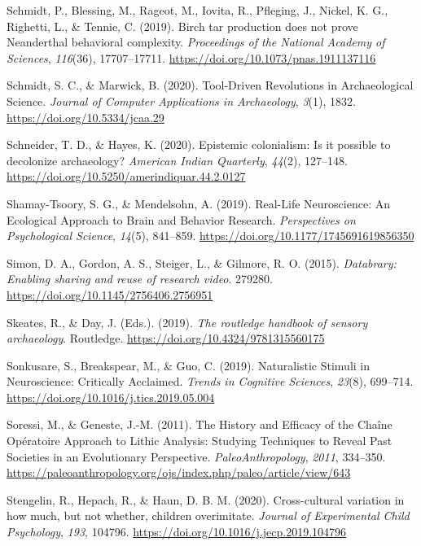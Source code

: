 \documentclass[
  11pt,
  letterpaper,
  DIV=11,
  numbers=noendperiod]{scrartcl}
\newlength{\cslhangindent}
\newenvironment{CSLReferences}[2] %
 {\begin{list}{}{%
  \setlength{\itemindent}{0pt}
  \setlength{\leftmargin}{0pt}
  \setlength{\parsep}{0pt}
  \ifodd #1
   \setlength{\leftmargin}{\cslhangindent}
   \setlength{\itemindent}{-1\cslhangindent}
  \fi
  \setlength{\itemsep}{#2\baselineskip}}}
 {\end{list}}
\begin{document}
\begin{CSLReferences}{1}{0}
Schmidt, P., Blessing, M., Rageot, M., Iovita, R., Pfleging, J., Nickel,
K. G., Righetti, L., \& Tennie, C. (2019). Birch tar production does not
prove Neanderthal behavioral complexity. \emph{Proceedings of the
National Academy of Sciences}, \emph{116}(36), 17707--17711.
\url{https://doi.org/10.1073/pnas.1911137116}

Schmidt, S. C., \& Marwick, B. (2020). Tool-Driven Revolutions in
Archaeological Science. \emph{Journal of Computer Applications in
Archaeology}, \emph{3}(1), 1832. \url{https://doi.org/10.5334/jcaa.29}

Schneider, T. D., \& Hayes, K. (2020). Epistemic colonialism: Is it
possible to decolonize archaeology? \emph{American Indian Quarterly},
\emph{44}(2), 127--148.
\url{https://doi.org/10.5250/amerindiquar.44.2.0127}

Shamay-Tsoory, S. G., \& Mendelsohn, A. (2019). Real-Life Neuroscience:
An Ecological Approach to Brain and Behavior Research.
\emph{Perspectives on Psychological Science}, \emph{14}(5), 841--859.
\url{https://doi.org/10.1177/1745691619856350}

Simon, D. A., Gordon, A. S., Steiger, L., \& Gilmore, R. O. (2015).
\emph{Databrary: Enabling sharing and reuse of research video}. 279280.
\url{https://doi.org/10.1145/2756406.2756951}

Skeates, R., \& Day, J. (Eds.). (2019). \emph{The routledge handbook of
sensory archaeology}. Routledge.
\url{https://doi.org/10.4324/9781315560175}

Sonkusare, S., Breakspear, M., \& Guo, C. (2019). Naturalistic Stimuli
in Neuroscience: Critically Acclaimed. \emph{Trends in Cognitive
Sciences}, \emph{23}(8), 699--714.
\url{https://doi.org/10.1016/j.tics.2019.05.004}

Soressi, M., \& Geneste, J.-M. (2011). The History and Efficacy of the
Chaîne Opératoire Approach to Lithic Analysis: Studying Techniques to
Reveal Past Societies in an Evolutionary Perspective.
\emph{PaleoAnthropology}, \emph{2011}, 334--350.
\url{https://paleoanthropology.org/ojs/index.php/paleo/article/view/643}

Stengelin, R., Hepach, R., \& Haun, D. B. M. (2020). Cross-cultural
variation in how much, but not whether, children overimitate.
\emph{Journal of Experimental Child Psychology}, \emph{193}, 104796.
\url{https://doi.org/10.1016/j.jecp.2019.104796}


\end{CSLReferences}
\end{document}

